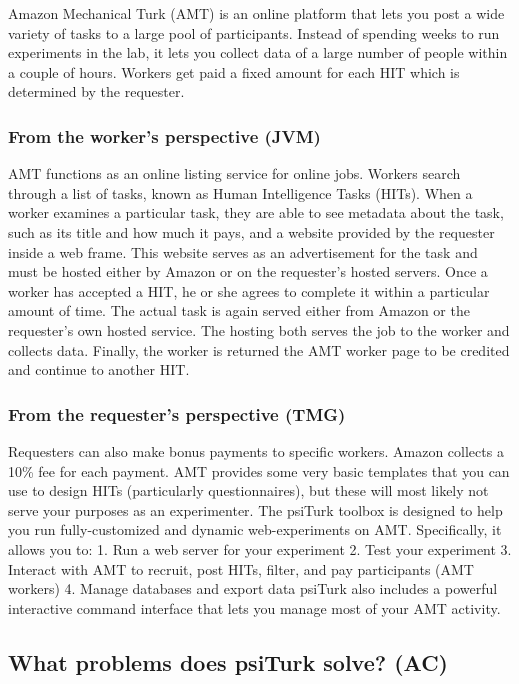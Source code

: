 \documentclass[jou,apacite]{apa6}
\begin{document}
Amazon Mechanical Turk (AMT) is an online platform that lets you post a wide variety of tasks to a large pool of participants.
Instead of spending weeks to run experiments in the lab, it lets you collect data of a large number of people within a couple of hours.
Workers get paid a fixed amount for each HIT which is determined by the requester.

\subsubsection{From the worker's perspective (JVM)}
AMT functions as an online listing service for online jobs.
Workers search through a list of tasks, known as Human Intelligence Tasks (HITs). 
When a worker examines a particular task, they are able to see metadata about the task, such as its title and how much it pays, and a website provided by the requester inside a web frame.
This website serves as an advertisement for the task and must be hosted either by Amazon or on the requester's hosted servers.
Once a worker has accepted a HIT, he or she agrees to complete it within a particular amount of time.
The actual task is again served either from Amazon or the requester's own hosted service.
The hosting both serves the job to the worker and collects data.
Finally, the worker is returned the AMT worker page to be credited and continue to another HIT.

\subsubsection{From the requester's perspective (TMG)}
Requesters can also make bonus payments to specific workers. Amazon collects a 10\% fee for each payment.
AMT provides some very basic templates that you can use to design HITs (particularly questionnaires), but these will most likely not serve your purposes as an experimenter.
The psiTurk toolbox is designed to help you run fully-customized and dynamic web-experiments on AMT.
Specifically, it allows you to:
1. Run a web server for your experiment
2. Test your experiment
3. Interact with AMT to recruit, post HITs, filter, and pay participants (AMT workers)
4. Manage databases and export data
psiTurk also includes a powerful interactive command interface that lets you manage most of your AMT activity.


\subsection{What problems does psiTurk solve? (AC)}
\end{document}
